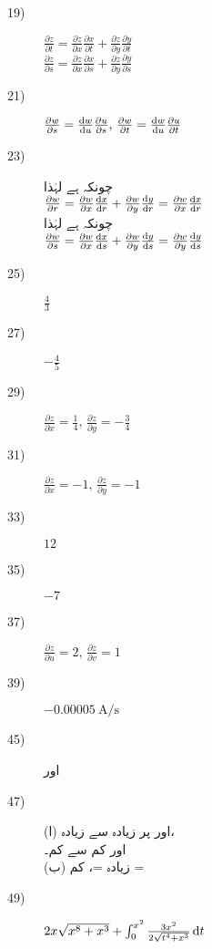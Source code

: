 \begin {description}
\item [
19)
]
 $\tfrac {\partial z}{\partial t}=\tfrac {\partial z}{\partial x}\tfrac {\partial x}{\partial t}+\tfrac {\partial z}{\partial y}\tfrac {\partial y}{\partial t}$\\ $\tfrac {\partial z}{\partial s}=\tfrac {\partial z}{\partial x}\tfrac {\partial x}{\partial s}+\tfrac {\partial z}{\partial y}\tfrac {\partial y}{\partial s}$ 
\item [
21)
]
 $\tfrac {\partial w}{\partial s}=\tfrac {\dif w}{\dif u}\tfrac {\partial u}{\partial s},\,\tfrac {\partial w}{\partial t}=\tfrac {\dif w}{\dif u}\tfrac {\partial u}{\partial t}$ 
\item [
23)
]
 چونکہ  ہے لہٰذا \\ $\tfrac {\partial w}{\partial r}=\tfrac {\partial w}{\partial x}\tfrac {\dif x}{\dif r}+\tfrac {\partial w}{\partial y}\tfrac {\dif y}{\dif r}=\tfrac {\partial w}{\partial x}\tfrac {\dif x}{\dif r}$\\ چونکہ  ہے لہٰذا \\ $\tfrac {\partial w}{\partial s}=\tfrac {\partial w}{\partial x}\tfrac {\dif x}{\dif s}+\tfrac {\partial w}{\partial y}\tfrac {\dif y}{\dif s}=\tfrac {\partial w}{\partial y}\tfrac {\dif y}{\dif s}$ 
\item [
25)
]
 $\tfrac {4}{3}$ 
\item [
27)
]
 $-\tfrac {4}{5}$ 
\item [
29)
]
 $\tfrac {\partial z}{\partial x}=\tfrac {1}{4},\,\tfrac {\partial z}{\partial y}=-\tfrac {3}{4}$ 
\item [
31)
]
 $\tfrac {\partial z}{\partial x}=-1,\,\tfrac {\partial z}{\partial y}=-1$ 
\item [
33)
]
 $12$ 
\item [
35)
]
 $-7$ 
\item [
37)
]
 $\tfrac {\partial z}{\partial u}=2,\,\tfrac {\partial z}{\partial v}=1$ 
\item [
39)
]
 $\SI {-0.00005}{\ampere \per \second }$ 
\item [
45)
]
  اور  
\item [
47)
]
 (ا)  اور  پر زیادہ سے زیادہ،\\  اور  کم سے کم۔\\ (ب) زیادہ =، کم = 
\item [
49)
]
 $2x\sqrt {x^8+x^3}+\int _0^{x^2}\tfrac {3x^2}{2\sqrt {t^4+x^3}}\dif t$ 
\end {description}
